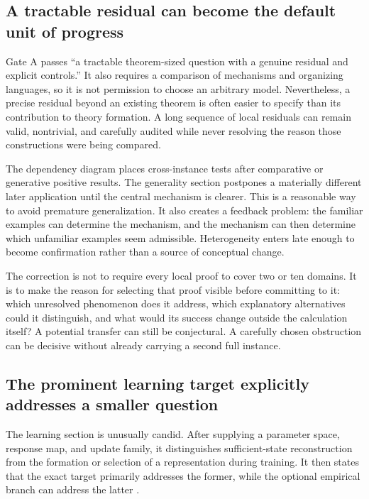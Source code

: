 \documentclass[11pt]{article}
\begin{document}
\subsection{A tractable residual can become the default unit of progress}

Gate A passes ``a tractable theorem-sized question with a genuine residual and explicit controls.'' It also requires a comparison of mechanisms and organizing languages, so it is not permission to choose an arbitrary model. Nevertheless, a precise residual beyond an existing theorem is often easier to specify than its contribution to theory formation. A long sequence of local residuals can remain valid, nontrivial, and carefully audited while never resolving the reason those constructions were being compared.

The dependency diagram places cross-instance tests after comparative or generative positive results. The generality section postpones a materially different later application until the central mechanism is clearer. This is a reasonable way to avoid premature generalization. It also creates a feedback problem: the familiar examples can determine the mechanism, and the mechanism can then determine which unfamiliar examples seem admissible. Heterogeneity enters late enough to become confirmation rather than a source of conceptual change.

The correction is not to require every local proof to cover two or ten domains. It is to make the reason for selecting that proof visible before committing to it: which unresolved phenomenon does it address, which explanatory alternatives could it distinguish, and what would its success change outside the calculation itself? A potential transfer can still be conjectural. A carefully chosen obstruction can be decisive without already carrying a second full instance.

\subsection{The prominent learning target explicitly addresses a smaller question}
\label{sec:learning-gap}

The learning section is unusually candid. After supplying a parameter space, response map, and update family, it distinguishes sufficient-state reconstruction from the formation or selection of a representation during training. It then states that the exact target primarily addresses the former, while the optional empirical branch can address the latter \cite[Learning dynamics as a candidate generative test]{Contract}.
\end{document}
